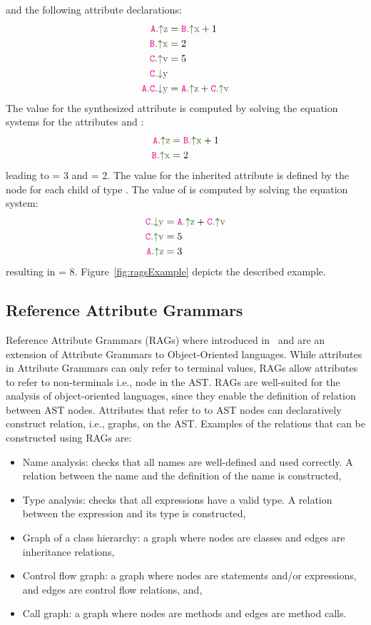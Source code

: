 and the following attribute declarations:
    \begin{align*}
        \Asyn{A}{z}& = \Asyn{B}{x} + 1 \\
        \Asyn{B}{x}& = 2 \\
        \Asyn{C}{v}& = 5 \\
        \Ainh{C}{y}& \\
        \Ainhdef{A}{C}{y}& = \Asyn{A}{z} + \Asyn{C}{v} \\
    \end{align*}
The value for the synthesized attribute  is computed by solving
the equation systems for the attributes  and :
\begin{align*}
    \Asyn{A}{z} &= \Asyn{B}{x} + 1 \\
    \Asyn{B}{x} &= 2
\end{align*}
leading to  = 3 and  = 2.
The value for the inherited attribute  is defined by the node  for
each child of type . The value of  is computed by solving the equation system:
\begin{align*}
    \Ainh{C}{y} &= \Asyn{A}{z} + \Asyn{C}{v} \\
    \Asyn{C}{v} &= 5\\
    \Asyn{A}{z} &= 3
\end{align*}
resulting in  = 8. Figure~\ref{fig:ragsExample} depicts the described example.


\subsection{Reference Attribute Grammars}
\label{sec:rag}
Reference Attribute Grammars (RAGs) where introduced in~\cite{DBLP:journals/informaticaSI/Hedin00}
and are an extension of Attribute Grammars to Object-Oriented languages. While attributes in Attribute Grammars
can only refer to terminal values, RAGs allow attributes to refer to non-terminals i.e., node in the AST.
RAGs are well-suited for the analysis of object-oriented languages, since they enable
the definition of relation between AST nodes. Attributes that refer to
to AST nodes can declaratively construct relation, i.e., graphs, on the AST.
Examples of the relations that can be constructed using RAGs are:
\begin{itemize}
    \item Name analysis: checks that all names are well-defined and used correctly. A relation between
    the name and the definition of the name is constructed,
    \item Type analysis: checks that all expressions have a valid type. A relation between the expression
    and its type is constructed,
    \item Graph of a class hierarchy: a graph where nodes are classes and edges are inheritance relations,
    \item Control flow graph: a graph where nodes are statements and/or expressions, and edges are control flow relations, and,
    \item Call graph: a graph where nodes are methods and edges are method calls.
\end{itemize}

